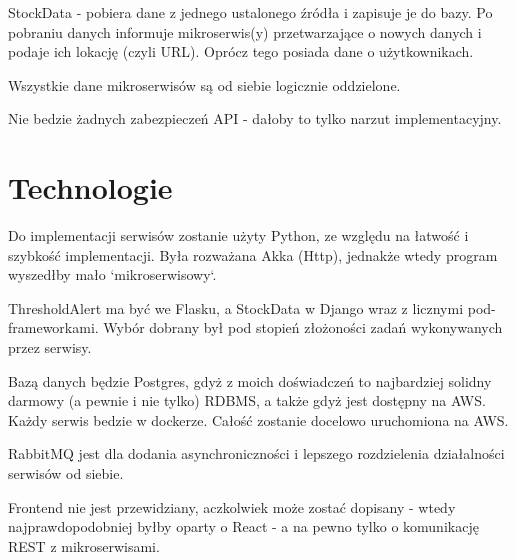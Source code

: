 \documentclass[12pt]{article}
\begin{document}
StockData - pobiera dane z jednego ustalonego źródła i zapisuje je do bazy. Po pobraniu danych informuje mikroserwis(y) przetwarzające o nowych danych i podaje ich lokację (czyli URL). Oprócz tego posiada dane o użytkownikach.

Wszystkie dane mikroserwisów są od siebie logicznie oddzielone.

Nie bedzie żadnych zabezpieczeń API - dałoby to tylko narzut implementacyjny.

\section{Technologie}

Do implementacji serwisów zostanie użyty Python, ze względu na łatwość i szybkość implementacji. Była rozważana Akka (Http), jednakże wtedy program wyszedłby mało `mikroserwisowy`.

ThresholdAlert ma być we Flasku, a StockData w Django wraz z licznymi pod-frameworkami. Wybór dobrany był pod stopień złożoności zadań wykonywanych przez serwisy.

Bazą danych będzie Postgres, gdyż z moich doświadczeń to najbardziej solidny darmowy (a pewnie i nie tylko) RDBMS, a także gdyż jest dostępny na AWS. Każdy serwis bedzie w dockerze. Całość zostanie docelowo uruchomiona na AWS.

RabbitMQ jest dla dodania asynchroniczności i lepszego rozdzielenia działalności serwisów od siebie.

Frontend nie jest przewidziany, aczkolwiek może zostać dopisany - wtedy najprawdopodobniej byłby oparty o React - a na pewno tylko o komunikację REST z mikroserwisami.
\end{document}
